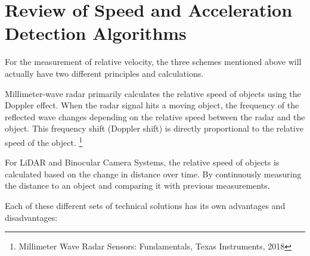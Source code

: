 \section{Review of Speed and Acceleration Detection Algorithms}

For the measurement of relative velocity, the three schemes mentioned above will actually have two different principles and calculations.

Millimeter-wave radar primarily calculates the relative speed of objects using the Doppler effect. When the radar signal hits a moving object, the frequency of the reflected wave changes depending on the relative speed between the radar and the object. This frequency shift (Doppler shift) is directly proportional to the relative speed of the object. \footnote{Millimeter Wave Radar Sensors: Fundamentals, Texas Instruments, 2018}

For LiDAR and Binocular Camera Systems, the relative speed of objects is calculated based on the change in distance over time. By continuously measuring the distance to an object and comparing it with previous measurements.

Each of these different sets of technical solutions has its own advantages and disadvantages:

